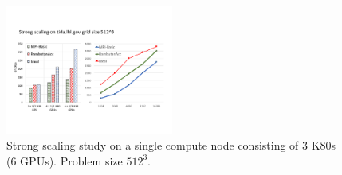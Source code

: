 \begin{figure}[htb]
\centering
\includegraphics[width=0.49\textwidth]{figures/stencil_tida.pdf}
\caption{Strong scaling study on a single compute node consisting of 3 K80s (6 GPUs). Problem size $512^3$.}
\label{stencil_onnode}
\end{figure}

